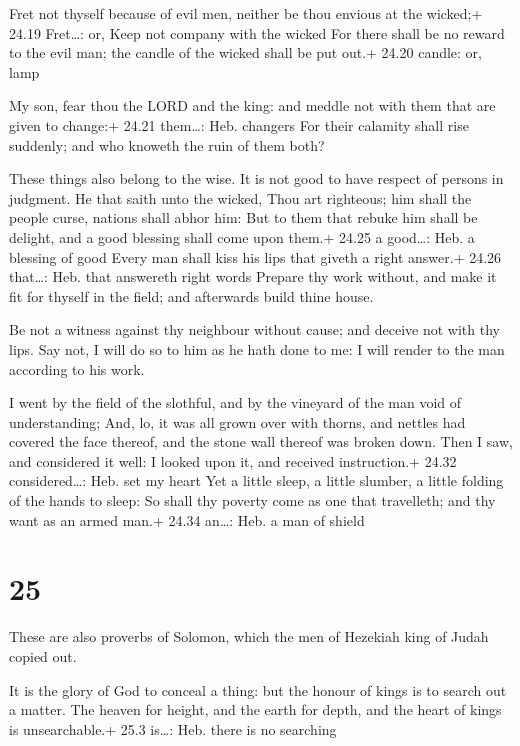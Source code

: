  Fret not thyself because of evil men, neither be thou
envious at the wicked;+ 24.19 Fret\ldots: or, Keep not company with the
wicked  For there shall be no reward to the evil man; the
candle of the wicked shall be put out.+ 24.20 candle: or, lamp

 My son, fear thou the LORD and the king: and meddle not
with them that are given to change:+ 24.21 them\ldots: Heb. changers
 For their calamity shall rise suddenly; and who knoweth
the ruin of them both?

 These things also belong to the wise. It is not good to
have respect of persons in judgment.  He that saith unto
the wicked, Thou art righteous; him shall the people curse, nations
shall abhor him:  But to them that rebuke him shall be
delight, and a good blessing shall come upon them.+ 24.25 a good\ldots:
Heb. a blessing of good  Every man shall kiss his lips that
giveth a right answer.+ 24.26 that\ldots: Heb. that answereth right
words  Prepare thy work without, and make it fit for
thyself in the field; and afterwards build thine house.

 Be not a witness against thy neighbour without cause; and
deceive not with thy lips.  Say not, I will do so to him as
he hath done to me: I will render to the man according to his work.

 I went by the field of the slothful, and by the vineyard
of the man void of understanding;  And, lo, it was all
grown over with thorns, and nettles had covered the face thereof, and
the stone wall thereof was broken down.  Then I saw, and
considered it well: I looked upon it, and received instruction.+ 24.32
considered\ldots: Heb. set my heart  Yet a little sleep, a
little slumber, a little folding of the hands to sleep:  So
shall thy poverty come as one that travelleth; and thy want as an armed
man.+ 24.34 an\ldots: Heb. a man of shield

\hypertarget{section-24}{%
\section{25}\label{section-24}}

 These are also proverbs of Solomon, which the men of
Hezekiah king of Judah copied out.

 It is the glory of God to conceal a thing: but the honour
of kings is to search out a matter.  The heaven for height,
and the earth for depth, and the heart of kings is unsearchable.+ 25.3
is\ldots: Heb. there is no searching


